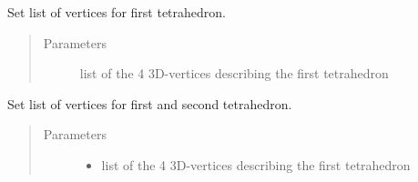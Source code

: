 \documentclass[letterpaper,10pt,english]{sphinxmanual}
\begin{document}
\begin{fulllineitems}
\begin{fulllineitems}
\begin{quote}
\begin{description}
\begin{itemize}
\end{itemize}

\end{description}\end{quote}

\end{fulllineitems}


\begin{fulllineitems}
\label{\detokenize{pk_src.collision_tet_tet:pk_src.collision_tet_tet.Collision_tet_tet.separating_plane_faceB_1}}
\end{fulllineitems}


\begin{fulllineitems}
\label{\detokenize{pk_src.collision_tet_tet:pk_src.collision_tet_tet.Collision_tet_tet.separating_plane_faceB_2}}
\end{fulllineitems}


\begin{fulllineitems}
\label{\detokenize{pk_src.collision_tet_tet:pk_src.collision_tet_tet.Collision_tet_tet.setV1}}
Set list of vertices for first tetrahedron.
\begin{quote}\begin{description}
\item[{Parameters}] \leavevmode
{} \textendash{} list of the 4 3D-vertices describing the first tetrahedron

\end{description}\end{quote}

\end{fulllineitems}


\begin{fulllineitems}
\label{\detokenize{pk_src.collision_tet_tet:pk_src.collision_tet_tet.Collision_tet_tet.setV1V2}}
Set list of vertices for first and second tetrahedron.
\begin{quote}\begin{description}
\item[{Parameters}] \leavevmode\begin{itemize}
\item {} 
 \textendash{} list of the 4 3D-vertices describing the first tetrahedron


\end{itemize}
\end{description}
\end{quote}
\end{fulllineitems}
\end{fulllineitems}
\end{document}
